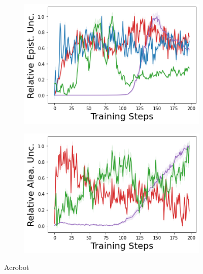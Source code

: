\begin{figure}
\begin{subfigure}{.24\textwidth}
    \end{subfigure}
    \begin{subfigure}{.24\textwidth}
        \includegraphics[width=\textwidth]{sections/011_icml2022/resources/acrobot-training_epistemic_uncertainty-training-model.png}
    \end{subfigure}
    \begin{subfigure}{.24\textwidth}
        \includegraphics[width=\textwidth]{sections/011_icml2022/resources/acrobot-training_aleatoric_ucertainty-training-model.png}  
    \end{subfigure}
    \vspace{-3mm}
    \caption*{Acrobot}
    \vspace{2mm}


\end{figure}
